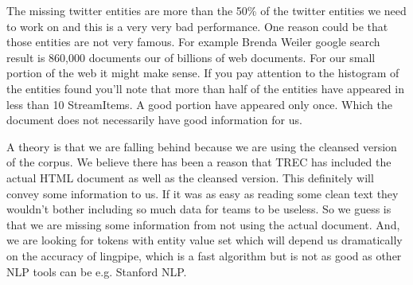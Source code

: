 The missing twitter entities are more than the 50\% of the twitter entities we 
need to work on and this is a very very bad performance. One reason could be 
that those entities are not very famous. For example Brenda Weiler google 
search result is 860,000 documents our of billions of web documents. For our 
small portion of the web it might make sense. If you pay attention to the 
histogram of the entities found you'll note that more than half of the 
entities have appeared in less than 10 StreamItems. A good portion have 
appeared only once. Which the document does not necessarily have good 
information for us.

A theory is that we are falling behind because we are using the cleansed 
version of the corpus. We believe there has been a reason that TREC has 
included the actual HTML document as well as the cleansed version. This 
definitely will convey some information to us. If it was as easy as reading 
some clean text they wouldn't bother including so much data for teams to be 
useless. So we guess is that we are missing some information from not using 
the actual document. And, we are looking for tokens with entity value set 
which will depend us dramatically on the accuracy of lingpipe, which is a fast 
algorithm but is not as good as other NLP tools can be e.g. Stanford NLP.


